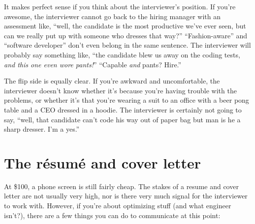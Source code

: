 \documentclass{article}
\begin{document}
  It makes perfect sense if you think about the interviewer's position. If
  you're awesome, the interviewer cannot go back to the hiring manager with an
  assessment like, ``well, the candidate is the most productive we've ever
  seen, but can we really put up with someone who dresses that way?''
  ``Fashion-aware'' and ``software developer'' don't even belong in the same
  sentence. The interviewer will probably say something like, ``the candidate
  blew us away on the coding tests, {\em and this one even wore pants!}''
  ``Capable {\em and} pants? Hire.''

  The flip side is equally clear. If you're awkward and uncomfortable, the
  interviewer doesn't know whether it's because you're having trouble with the
  problems, or whether it's that you're wearing a suit to an office with a beer
  pong table and a CEO dressed in a hoodie. The interviewer is certainly not
  going to say, ``well, that candidate can't code his way out of paper bag but
  man is he a sharp dresser. I'm a yes.''

\section{The r\'esum\'e and cover letter}\label{sec:resume}
  At \$100, a phone screen is still fairly cheap. The stakes of a resume and
  cover letter are not usually very high, nor is there very much signal for the
  interviewer to work with. However, if you're about optimizing stuff (and
  what engineer isn't?), there are a few things you can do to communicate at
  this point:
\end{document}

